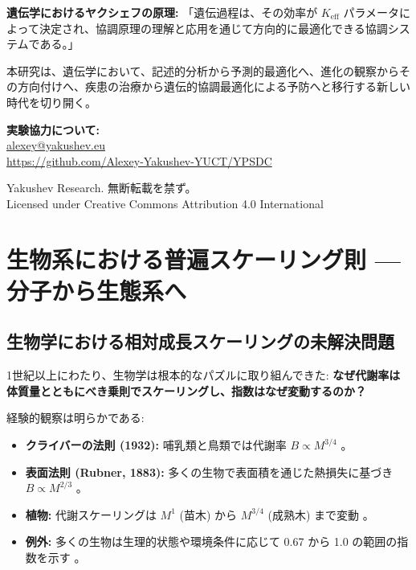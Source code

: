 \documentclass[12pt]{article}
\begin{document}
	\textbf{遺伝学におけるヤクシェフの原理:}
	「遺伝過程は、その効率が $K_{\text{eff}}$ パラメータによって決定され、協調原理の理解と応用を通じて方向的に最適化できる協調システムである。」
	
	本研究は、遺伝学において、記述的分析から予測的最適化へ、進化の観察からその方向付けへ、疾患の治療から遺伝的協調最適化による予防へと移行する新しい時代を切り開く。
	
	\begin{center}
		\vspace{1cm}
		\textbf{実験協力について:}\\
		\url{alexey@yakushev.eu}\\
		\url{https://github.com/Alexey-Yakushev-YUCT/YPSDC}
		
		\vspace{0.5cm}
		 Yakushev Research. 無断転載を禁ず。\\
		Licensed under Creative Commons Attribution 4.0 International
	\end{center}
	
	\section{生物系における普遍スケーリング則 — 分子から生態系へ}
	\label{sec:bio-scaling}
	
	\subsection{生物学における相対成長スケーリングの未解決問題}
	
	1世紀以上にわたり、生物学は根本的なパズルに取り組んできた: \textbf{なぜ代謝率は体質量とともにべき乗則でスケーリングし、指数はなぜ変動するのか？}
	
	経験的観察は明らかである:
	\begin{itemize}
		\item \textbf{クライバーの法則 (1932):} 哺乳類と鳥類では代謝率 \(B \propto M^{3/4}\) \cite{Kleiber1932,West1997}。
		\item \textbf{表面法則 (Rubner, 1883):} 多くの生物で表面積を通じた熱損失に基づき \(B \propto M^{2/3}\) \cite{Rubner1883}。
		\item \textbf{植物:} 代謝スケーリングは \(M^{1}\) (苗木) から \(M^{3/4}\) (成熟木) まで変動 \cite{Reich2006}。
		\item \textbf{例外:} 多くの生物は生理的状態や環境条件に応じて 0.67 から 1.0 の範囲の指数を示す \cite{Glazier2005}。
	\end{itemize}
	
\end{document}
